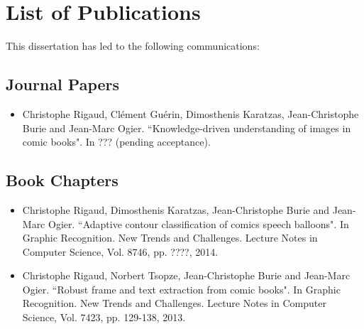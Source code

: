 \chapter*{List of Publications}

This dissertation has led to the following communications:

\section*{Journal Papers}

\begin{itemize}

\item Christophe Rigaud, Cl{\'e}ment Gu{\'e}rin, Dimosthenis Karatzas, Jean-Christophe Burie and Jean-Marc Ogier. ``Knowledge-driven understanding of images in comic books". In ??? (pending acceptance).
\vspace*{.3cm}

\vspace*{.3cm}

\end{itemize}

\section*{Book Chapters}

\begin{itemize}

\item Christophe Rigaud, Dimosthenis Karatzas, Jean-Christophe Burie and Jean-Marc Ogier. ``Adaptive contour classification of comics speech balloons". In Graphic Recognition. New Trends and Challenges. Lecture Notes in Computer Science, Vol. 8746, pp. ????, 2014.
\vspace*{.3cm}

\item Christophe Rigaud, Norbert Tsopze, Jean-Christophe Burie and Jean-Marc Ogier. ``Robust frame and text extraction from comic books". In Graphic Recognition. New Trends and Challenges. Lecture Notes in Computer Science, Vol. 7423, pp. 129-138, 2013.
\vspace*{.3cm}

\end{itemize}

